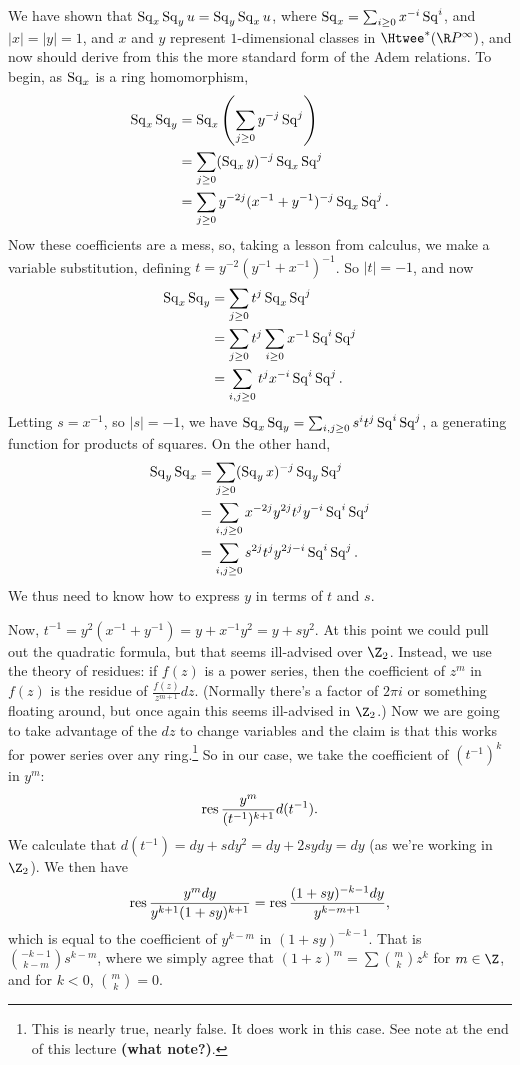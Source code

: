 We have shown that $\operatorname{Sq}_x \operatorname{Sq}_y u = \operatorname{Sq}_y \operatorname{Sq}_x u$, where $\operatorname{Sq}_x = \sum_{i \ge 0} x^{-i} \operatorname{Sq}^i$, and $|x| = |y| = 1$, and $x$ and $y$ represent $1$-dimensional classes in $\Htwee^* (\RP^\infty)$, and now should derive from this the more standard form of the Adem relations. To begin, as $\operatorname{Sq}_x$ is a ring homomorphism,
\begin{align*}
\operatorname{Sq}_x \operatorname{Sq}_y & = \operatorname{Sq}_x \left( \sum_{j \ge 0} y^{-j} \operatorname{Sq}^j \right) \\
& = \sum_{j \ge 0}(\operatorname{Sq}_x y)^{-j} \operatorname{Sq}_x \operatorname{Sq}^j \\
& = \sum_{j \ge 0} y^{-2j}(x^{-1} + y^{-1})^{-j} \operatorname{Sq}_x \operatorname{Sq}^j.
\end{align*}
Now these coefficients are a mess, so, taking a lesson from calculus, we make a variable substitution, defining $t = y^{-2}(y^{-1} + x^{-1})^{-1}$.  So $|t| = -1$, and now
\begin{align*}
\operatorname{Sq}_x \operatorname{Sq}_y & = \sum_{j \ge 0} t^j \operatorname{Sq}_x \operatorname{Sq}^j \\
& = \sum_{j \ge 0} t^j \sum_{i \ge 0} x^{-1} \operatorname{Sq}^i \operatorname{Sq}^j \\
& = \sum_{i, j \ge 0} t^j x^{-i} \operatorname{Sq}^i \operatorname{Sq}^j.
\end{align*}
Letting $s = x^{-1}$, so $|s| = -1$, we have $\operatorname{Sq}_x \operatorname{Sq}_y = \sum_{i, j \ge 0} s^i t^j \operatorname{Sq}^i \operatorname{Sq}^j$, a generating function for products of squares.  On the other hand,
\begin{align*}
\operatorname{Sq}_y \operatorname{Sq}_x & = \sum_{j \ge 0}(\operatorname{Sq}_y x)^{-j} \operatorname{Sq}_y \operatorname{Sq}^j \\
& = \sum_{i, j \ge 0} x^{-2j} y^{2j} t^j y^{-i} \operatorname{Sq}^i \operatorname{Sq}^j \\
& = \sum_{i, j \ge 0} s^{2j} t^j y^{2j-i} \operatorname{Sq}^i \operatorname{Sq}^j.
\end{align*}
We thus need to know how to express $y$ in terms of $t$ and $s$.

Now, $t^{-1} = y^2(x^{-1} + y^{-1}) = y + x^{-1} y^2 = y + s y^2$.  At this point we could pull out the quadratic formula, but that seems ill-advised over $\Z_2$.  Instead, we use the theory of residues: if $f(z)$ is a power series, then the coefficient of $z^m$ in $f(z)$ is the residue of $\frac{f(z)}{z^{m+1}}dz$.  (Normally there's a factor of $2 \pi i$ or something floating around, but once again this seems ill-advised in $\Z_2$.)  Now we are going to take advantage of the $dz$ to change variables and the claim is that this works for power series over any ring.\footnote{This is nearly true, nearly false.  It does work in this case.  See note at the end of this lecture \textbf{(what note?)}. %
}  So in our case, we take the coefficient of $(t^{-1})^k$ in $y^m$: \[\operatorname{res} \frac{y^m}{(t^{-1})^{k+1}} d(t^{-1}).\]  We calculate that $d(t^{-1}) = dy + sdy^2 = dy + 2sydy = dy$ (as we're working in $\Z_2$).  We then have
\[\operatorname{res} \frac{y^m dy}{y^{k+1}(1 + sy)^{k+1}} = \operatorname{res} \frac{(1+sy)^{-k-1} dy}{y^{k-m+1}},\]
which is equal to the coefficient of $y^{k-m}$ in $(1+sy)^{-k-1}$. That is $\binom{-k-1}{k-m}s^{k-m}$, where we simply agree that $(1 + z)^m = \sum \binom{m}{k} z^k$ for $m \in \Z$, and for $k < 0$, $\binom{m}{k} = 0$.

